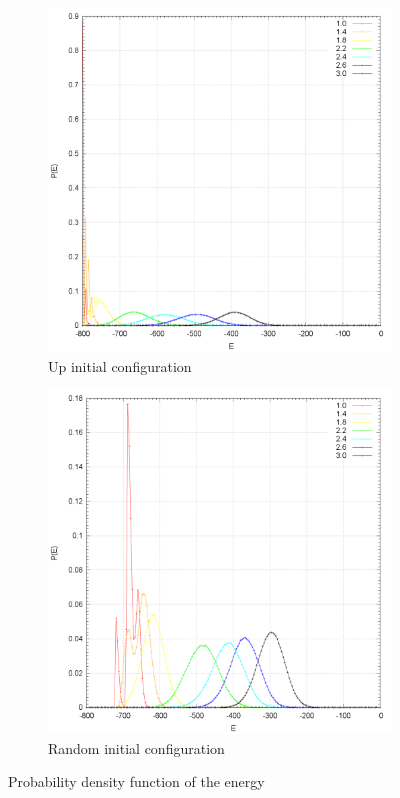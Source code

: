 \documentclass[10pt,a4paper,titlepage]{article}
\begin{document}
\begin{center}
\begin{figure}[H]
 \centering
\begin{subfigure}{.5\textwidth}
  \centering
  \includegraphics[width=.8\linewidth]{Energy_Counts}
  \caption{{\footnotesize Up initial configuration}}
  \label{fig:sfig1}
\end{subfigure}%
\begin{subfigure}{.5\textwidth}
  \centering
  \includegraphics[width=.8\linewidth]{Energy_Countsr}
  \caption{{\footnotesize Random initial configuration}}
  \label{fig:sfig2}
\end{subfigure}
\caption{{\footnotesize Probability density function of the energy}}
\label{fig:fig}
\end{figure}
\end{center}
\end{document}
